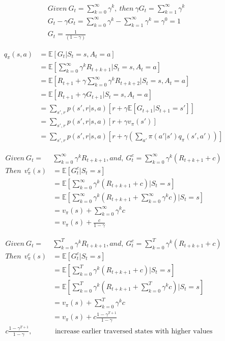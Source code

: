 \documentclass{article}
\begin{document}
\[
  \begin{aligned}
  &Given \ G_t = \sum_{k=0}^{\infty} \gamma^k, \ then \ \gamma G_t = \sum_{k=1}^{\infty} \gamma^k\\
  &G_t - \gamma G_t = \sum_{k=0}^{\infty} \gamma^k - \sum_{k=1}^{\infty} \gamma^k = \gamma^0 = 1\\
  &G_t = \frac {1} {(1 - \gamma)}
  \end{aligned}
\]

\[
  \begin{aligned}
    q_{\pi}(s,a) &= \mathbb{E}[G_t| S_{t}=s, A_{t}=a]\\
    &= \mathbb{E}[\sum_{k=0}^{\infty}\gamma^kR_{t+k+1} | S_{t}=s, A_{t}=a]\\
    &= \mathbb{E}[R_{t+1} + \gamma \sum_{k=0}^{\infty}\gamma^kR_{t+k+2} | S_{t}=s, A_{t}=a]\\
    &= \mathbb{E}[R_{t+1} + \gamma G_{t+1} | S_{t}=s, A_{t}=a]\\
    &= \sum_{s',r}p(s',r|s,a)[r + \gamma \mathbb{E}[ G_{t+1} | S_{t+1}=s']]\\
    &= \sum_{s',r}p(s',r|s,a)[r + \gamma v_\pi(s')]\\
    &= \sum_{s',r}p(s',r|s,a)[r + \gamma (\sum_{a'}\pi(a'|s') q_{\pi}(s',a'))]
  \end{aligned}
\]

\[
  \begin{aligned}
    Given \ G_t = &\sum_{k=0}^{\infty}\gamma^kR_{t+k+1}, and, \ G_t^c = \sum_{k=0}^{\infty}\gamma^k(R_{t+k+1} + c)\\
    Then \ \ v_{\pi}^c(s) &= \mathbb{E}[G_t^c | S_{t}=s]\\
    &= \mathbb{E}[\sum_{k=0}^{\infty}\gamma^k(R_{t+k+1} + c) | S_{t}=s]\\
    &= \mathbb{E}[\sum_{k=0}^{\infty}\gamma^k(R_{t+k+1} + \sum_{k=0}^{\infty}\gamma^kc) | S_{t}=s]\\
    &= v_{\pi}(s) + \sum_{k=0}^{\infty}\gamma^kc\\
    &= v_{\pi}(s) + \frac {c} {1-\gamma}
  \end{aligned}
\]

\[
  \begin{aligned}
    Given \ G_t = &\sum_{k=0}^{T}\gamma^kR_{t+k+1}, and, \ G_t^c = \sum_{k=0}^{T}\gamma^k(R_{t+k+1} + c)\\
    Then \ \ v_{\pi}^c(s) &= \mathbb{E}[G_t^c | S_{t}=s]\\
    &= \mathbb{E}[\sum_{k=0}^{T}\gamma^k(R_{t+k+1} + c) | S_{t}=s]\\
    &= \mathbb{E}[\sum_{k=0}^{T}\gamma^k(R_{t+k+1} + \sum_{k=0}^{T}\gamma^kc) | S_{t}=s]\\
    &= v_{\pi}(s) + \sum_{k=0}^{T}\gamma^kc\\
    &= v_{\pi}(s) + c\frac {1 - \gamma^{T+1}} {1-\gamma}\\
    c\frac {1 - \gamma^{T+1}} {1-\gamma}, &\text{ increase earlier traversed states with higher values }
  \end{aligned}
\]
\end{document}
